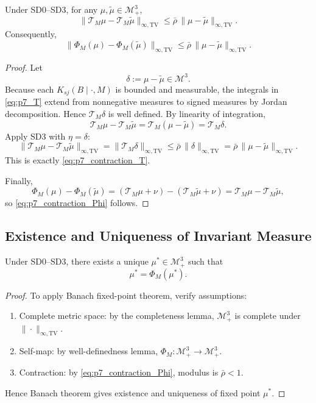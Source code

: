 \begin{lemma}
Under SD0--SD3, for any $\mu,\tilde\mu\in\mathcal M_+^3$,
\begin{equation}
\|\mathcal T_M\mu-\mathcal T_M\tilde\mu\|_{\infty,\mathrm{TV}}
\le\bar\rho\,\|\mu-\tilde\mu\|_{\infty,\mathrm{TV}}.
\label{eq:p7_contraction_T}
\end{equation}
Consequently,
\begin{equation}
\|\Phi_M(\mu)-\Phi_M(\tilde\mu)\|_{\infty,\mathrm{TV}}
\le\bar\rho\,\|\mu-\tilde\mu\|_{\infty,\mathrm{TV}}.
\label{eq:p7_contraction_Phi}
\end{equation}
\end{lemma}

\begin{proof}
Let
\[
\delta:=\mu-\tilde\mu\in\mathcal M^3.
\]
Because each $K_{sj}(B\mid\cdot,M)$ is bounded and measurable, the integrals in \eqref{eq:p7_T} extend from nonnegative measures to signed measures by Jordan decomposition. Hence $\mathcal T_M\delta$ is well defined. By linearity of integration,
\[
\mathcal T_M\mu-\mathcal T_M\tilde\mu
=
\mathcal T_M(\mu-\tilde\mu)
=
\mathcal T_M\delta.
\]
Apply SD3 with $\eta=\delta$:
\[
\|\mathcal T_M\mu-\mathcal T_M\tilde\mu\|_{\infty,\mathrm{TV}}
=
\|\mathcal T_M\delta\|_{\infty,\mathrm{TV}}
\le
\bar\rho\,\|\delta\|_{\infty,\mathrm{TV}}
=
\bar\rho\,\|\mu-\tilde\mu\|_{\infty,\mathrm{TV}}.
\]
This is exactly \eqref{eq:p7_contraction_T}.

Finally,
\[
\Phi_M(\mu)-\Phi_M(\tilde\mu)
=(\mathcal T_M\mu+\nu)-(\mathcal T_M\tilde\mu+\nu)
=\mathcal T_M\mu-\mathcal T_M\tilde\mu,
\]
so \eqref{eq:p7_contraction_Phi} follows.
\end{proof}

\subsection{Existence and Uniqueness of Invariant Measure}

\begin{proposition}
Under SD0--SD3, there exists a unique $\mu^*\in\mathcal M_+^3$ such that
\[
\mu^*=\Phi_M(\mu^*).
\]
\end{proposition}

\begin{proof}
To apply Banach fixed-point theorem, verify assumptions:
\begin{enumerate}
    \item Complete metric space: by the completeness lemma, $\mathcal M_+^3$ is complete under $\|\cdot\|_{\infty,\mathrm{TV}}$.
    \item Self-map: by well-definedness lemma, $\Phi_M:\mathcal M_+^3\to\mathcal M_+^3$.
    \item Contraction: by \eqref{eq:p7_contraction_Phi}, modulus is $\bar\rho<1$.
\end{enumerate}
Hence Banach theorem gives existence and uniqueness of fixed point $\mu^*$.
\end{proof}

